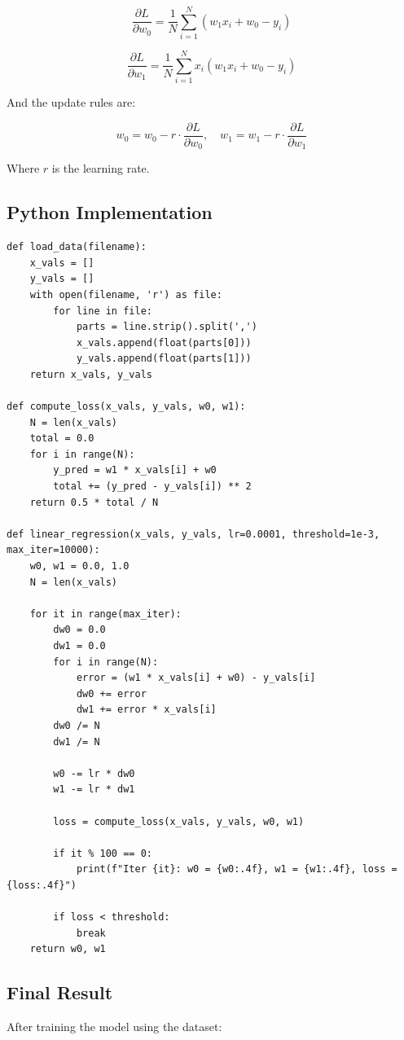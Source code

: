 \documentclass[12pt]{article}
\begin{document}
\[
\frac{\partial L}{\partial w_0} = \frac{1}{N} \sum_{i=1}^N (w_1 x_i + w_0 - y_i)
\]

\[
\frac{\partial L}{\partial w_1} = \frac{1}{N} \sum_{i=1}^N x_i (w_1 x_i + w_0 - y_i)
\]

And the update rules are:

\[
w_0 = w_0 - r \cdot \frac{\partial L}{\partial w_0}, \quad w_1 = w_1 - r \cdot \frac{\partial L}{\partial w_1}
\]

Where $r$ is the learning rate.

\subsection{Python Implementation}

\begin{verbatim}
def load_data(filename):
    x_vals = []
    y_vals = []
    with open(filename, 'r') as file:
        for line in file:
            parts = line.strip().split(',')
            x_vals.append(float(parts[0]))
            y_vals.append(float(parts[1]))
    return x_vals, y_vals
    
def compute_loss(x_vals, y_vals, w0, w1):
    N = len(x_vals)
    total = 0.0
    for i in range(N):
        y_pred = w1 * x_vals[i] + w0
        total += (y_pred - y_vals[i]) ** 2
    return 0.5 * total / N

def linear_regression(x_vals, y_vals, lr=0.0001, threshold=1e-3, max_iter=10000):
    w0, w1 = 0.0, 1.0
    N = len(x_vals)

    for it in range(max_iter):
        dw0 = 0.0
        dw1 = 0.0
        for i in range(N):
            error = (w1 * x_vals[i] + w0) - y_vals[i]
            dw0 += error
            dw1 += error * x_vals[i]
        dw0 /= N
        dw1 /= N

        w0 -= lr * dw0
        w1 -= lr * dw1

        loss = compute_loss(x_vals, y_vals, w0, w1)

        if it % 100 == 0:
            print(f"Iter {it}: w0 = {w0:.4f}, w1 = {w1:.4f}, loss = {loss:.4f}")

        if loss < threshold:
            break
    return w0, w1
\end{verbatim}

\subsection{Final Result}
After training the model using the dataset:
\end{document}
